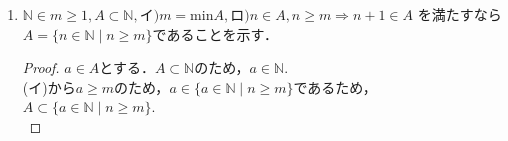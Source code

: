 \documentclass{ltjsarticle}
\theoremstyle{definition}
\theoremstyle{propcorollarystyle}
\theoremstyle{thmcorollarystyle}
\begin{document}
\begin{enumerate}[label={\arabic*}),itemsep=1em]
\begin{proof}
    $b_n = \log a_n$と置くと，仮定の極限は，\\
    \begin{align*}
      \lim_{n\to \infty} \frac{a_{n+1}}{a_n} &= \lim_{n\to \infty} \frac{e^{b_{n+1}}}{e^{b_n}} \\
      &= \lim_{n\to \infty} e^{b_{n+1}-b_n} \\
      &= \log a
    \end{align*}
    また求めたい極限は，$\sqrt[n]{a_n} = e^{\frac{b_n}{n}}$.
    このため，$\exp^{\frac{b_n}{n}}$の極限を求めればよい．
    さらに，$b_n$は以下のように変更できる．
    \begin{align*}
      b_n &= b_1 + \sum_{k=1}^{n-1} (b_k+1-b_k) \\
      \frac{b_n}{n} &= \frac{b_1}{n} + \frac{\sum_{k=1}^{n-1} (b_{k+1}-b_k)}{n} \\
    \end{align*}
    ここで，$d_k = b_{k+1}-b_k$とおくと，$(\epsilon>0)(\exists n_0\in \mathbb{N})(\forall n\ge n_0) \Rightarrow|d_n -\log a| < \epsilon$である.
    \begin{align*}
      \frac{\sum_{k=1}^{n-1} (b_{k+1}-b_k)}{n} &= \frac{\sum_{k=1}^{n-1} d_k}{n} \\
      &= \frac{\sum_{k=1}^{n_0-1} d_k}{n} + \frac{\sum_{k=n_0}^{n} d_k}{n}
    \end{align*}
    $d_k$の極限から，
    \begin{align*}
      \left|\frac{(d_{n_0}-\log a)+(d_{n_0+1}-\log a)+\cdots+(d_n-\log a)}{n}\right| \le \frac{n-n_0+1}{n}\epsilon \le \epsilon
    \end{align*}
    となるため，
    \begin{align*}
      \lim_{n\to \infty} \frac{b_n}{n} &= \log a \\
      &\Rightarrow \lim_{n \to \infty} \sqrt[n]{a} \\
      &= \lim_{n to \infty} e^{\frac{b_n}{n}} \\
      &= \lim_{n \to \infty} a = a
    \end{align*}
  \end{proof}
  \item $\mathbb{N}\in m \ge 1,A \subset \mathbb{N},\text{イ)}m=\text{min}A,\text{ロ)}n\in A,n\ge m\Rightarrow n+1 \in A$
  を満たすなら$A=\{n \in \mathbb{N} \mid n \ge m\}$であることを示す．
  \begin{proof}
    $a \in A$とする．$A \subset \mathbb{N}$のため，$a \in \mathbb{N}$.\\
    (イ)から$a \ge m$のため，$a \in \{a \in \mathbb{N}\mid n\ge m\}$であるため，$A \subset \{a \in \mathbb{N}\mid n\ge m\}$. \\

\end{proof}
\end{enumerate}
\end{document}
